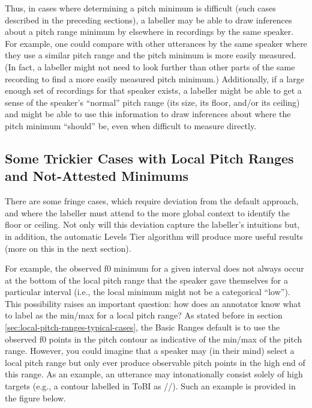 \documentclass[11pt, twoside]{memoir}
\def\polar#1{{\relsize{-.5}\fontspec[Mapping=tex-text]{Roboto Mono}{#1}}}
\def\tobi#1{\polar{#1}}
\begin{document}
Thus, in cases where determining a pitch minimum is difficult (such cases described in the preceding sections), a labeller may be able to draw inferences about a pitch range minimum by elsewhere in recordings by the same speaker. For example, one could compare with other utterances by the same speaker where they use a similar pitch range and the pitch minimum is more easily measured. (In fact, a labeller might not need to look further than other parts of the same recording to find a more easily measured pitch minimum.) Additionally, if a large enough set of recordings for that speaker exists, a labeller might be able to get a sense of the speaker’s “normal” pitch range (its size, its floor, and/or its ceiling) and might be able to use this information to draw inferences about where the pitch minimum “should” be, even when difficult to measure directly.

\subsection{Some Trickier Cases with Local Pitch Ranges and Not-Attested Minimums}\label{sec:some-trickier-cases-with-local-pitch-ranges}

There are some fringe cases, which require deviation from the default approach, and where the labeller must attend to the more global context to identify the floor or ceiling. Not only will this deviation capture the labeller’s intuitions but, in addition, the automatic Levels Tier algorithm will produce more useful results (more on this in the next section).

For example, the observed f0 minimum for a given interval does not always occur at the bottom of the local pitch range that the speaker gave themselves for a particular interval (i.e., the local minimum might not be a categorical “low”). This possibility raises an important question: how does an annotator know what to label as the min\slash max for a local pitch range? As stated before in section \ref{sec:local-pitch-ranges-typical-cases}, the Basic Ranges default is to use the observed f0 points in the pitch contour as indicative of the min\slash max of the pitch range. However, you could imagine that a speaker may (in their mind) select a local pitch range but only ever produce observable pitch points in the high end of this range. As an example, an utterance may intonationally consist solely of high targets (e.g., a contour labelled in ToBI as /\tobi{H* H* H-H\%}/). Such an example is provided in the figure below.
\end{document}
